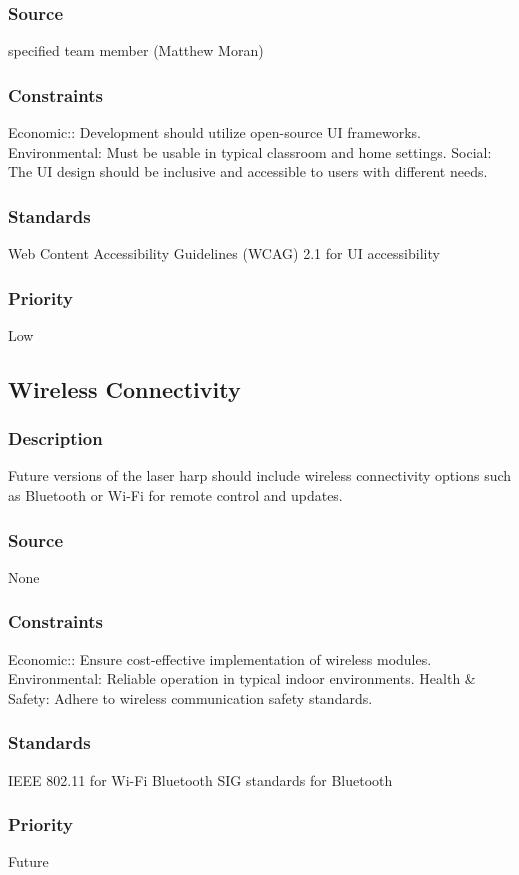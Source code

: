 \subsubsection{Source}
specified team member (Matthew Moran)
\subsubsection{Constraints}
Economic:: Development should utilize open-source UI frameworks.
Environmental: Must be usable in typical classroom and home settings.
Social: The UI design should be inclusive and accessible to users with different needs.
\subsubsection{Standards}
Web Content Accessibility Guidelines (WCAG) 2.1 for UI accessibility
\subsubsection{Priority}
Low


\subsection{Wireless Connectivity}
\subsubsection{Description}
Future versions of the laser harp should include wireless connectivity options such as Bluetooth or Wi-Fi for remote control and updates.
\subsubsection{Source}
None
\subsubsection{Constraints}
Economic:: Ensure cost-effective implementation of wireless modules.
Environmental: Reliable operation in typical indoor environments.
Health & Safety: Adhere to wireless communication safety standards.
\subsubsection{Standards}
IEEE 802.11 for Wi-Fi
Bluetooth SIG standards for Bluetooth
\subsubsection{Priority}
Future
